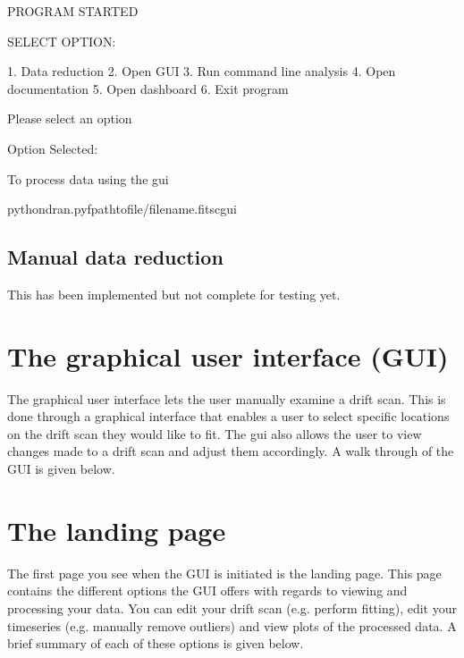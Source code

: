 \documentclass[letterpaper,10pt,english]{sphinxmanual}
\begin{document}
\begin{sphinxVerbatim}[commandchars=\\\{\},numbers=left,firstnumber=1,stepnumber=1]
\PYGZsh{}      PROGRAM STARTED


\PYGZsh{}\PYGZsh{} SELECT OPTION:
\PYGZhy{}\PYGZhy{}\PYGZhy{}\PYGZhy{}\PYGZhy{}\PYGZhy{}\PYGZhy{}\PYGZhy{}\PYGZhy{}\PYGZhy{}\PYGZhy{}\PYGZhy{}\PYGZhy{}\PYGZhy{}\PYGZhy{}\PYGZhy{}\PYGZhy{}\PYGZhy{}\PYGZhy{}\PYGZhy{}\PYGZhy{}\PYGZhy{}\PYGZhy{}\PYGZhy{}\PYGZhy{}\PYGZhy{}\PYGZhy{}\PYGZhy{}\PYGZhy{}\PYGZhy{}\PYGZhy{}\PYGZhy{}\PYGZhy{}\PYGZhy{}\PYGZhy{}

 1. Data reduction
 2. Open GUI
 3. Run command line analysis
 4. Open documentation
 5. Open dashboard
 6. Exit program

 Please select an option

 Option Selected:
\end{sphinxVerbatim}

\sphinxAtStartPar
To process data using the gui

\begin{sphinxVerbatim}[commandchars=\\\{\}]
\PYGZdl{}pythondran.py\PYGZhy{}fpath\PYGZhy{}to\PYGZhy{}file/filename.fits\PYGZhy{}cgui
\end{sphinxVerbatim}


\subsection{Manual data reduction}
\label{\detokenize{extras/cli:manual-data-reduction}}
\sphinxAtStartPar
This has been implemented but not complete for testing yet.

\sphinxstepscope


\section{The graphical user interface (GUI)}
\label{\detokenize{extras/gui:the-graphical-user-interface-gui}}\label{\detokenize{extras/gui::doc}}
\sphinxAtStartPar
The graphical user interface lets the user manually examine a drift scan.
This is done through a graphical interface that enables a user to select
specific locations on the drift scan they would like to fit. The gui also
allows the user to view changes made to a drift scan and adjust them
accordingly.  A walk through of the GUI is given below.


\section{The landing page}
\label{\detokenize{extras/gui:the-landing-page}}
\sphinxAtStartPar
The first page you see when the GUI is initiated is the landing page.
This page contains the different options the GUI offers with regards to viewing
and processing your data. You can edit your drift scan (e.g. perform fitting),
edit your timeseries (e.g. manually remove outliers) and view plots of the
processed data. A brief summary of each of these options is given below.
\end{document}
